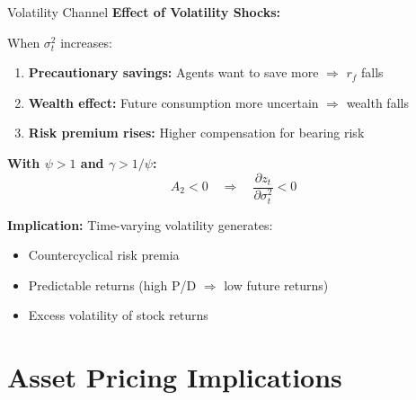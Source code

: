 \documentclass{beamer}
\begin{document}
\begin{frame}{Volatility Channel}
    \textbf{Effect of Volatility Shocks:}
    
    When $\sigma_t^2$ increases:
    \begin{enumerate}
        \item \textbf{Precautionary savings:} Agents want to save more $\Rightarrow$ $r_f$ falls
        \item \textbf{Wealth effect:} Future consumption more uncertain $\Rightarrow$ wealth falls
        \item \textbf{Risk premium rises:} Higher compensation for bearing risk
    \end{enumerate}
    
    \vspace{0.3cm}
    \textbf{With $\psi > 1$ and $\gamma > 1/\psi$:}
    \begin{equation}
        A_2 < 0 \quad \Rightarrow \quad \frac{\partial z_t}{\partial \sigma_t^2} < 0
    \end{equation}
    
    \textbf{Implication:} Time-varying volatility generates:
    \begin{itemize}
        \item Countercyclical risk premia
        \item Predictable returns (high P/D $\Rightarrow$ low future returns)
        \item Excess volatility of stock returns
    \end{itemize}
\end{frame}

\section{Asset Pricing Implications}
\end{document}
